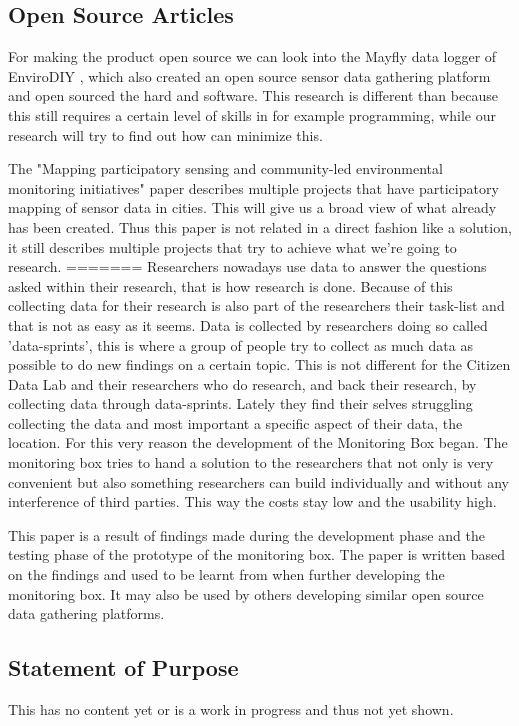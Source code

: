 \documentclass[conference]{IEEEtran}
\begin{document}
\subsection{Open Source Articles}
For making the product open source we can look into the Mayfly data logger of EnviroDIY \cite{arscott2017publishing},  which also created an open source sensor data gathering platform and open sourced the hard and software. This research is different than because this still requires a certain level of skills in for example programming, while our research will try to find out how can minimize this.
\par
The "Mapping participatory sensing and community-led environmental monitoring initiatives" \cite{balestrinideliverable} paper describes multiple projects that have participatory mapping of sensor data in cities. This will give us a broad view of what already has been created. Thus this paper is not related in a direct fashion like a solution, it still describes multiple projects that try to achieve what we're going to research.
=======
 Researchers nowadays use data to answer the questions asked within their research, that is how research is done. Because of this collecting data for their research is also part of the researchers their task-list and that is not as easy as it seems. Data is collected by researchers doing so called 'data-sprints', this is where a group of people try to collect as much data as possible to do new findings on a certain topic. This is not different for the Citizen Data Lab and their researchers who do research, and back their research, by collecting data through data-sprints. Lately they find their selves struggling collecting the data and most important a specific aspect of their data, the location. For this very reason the development of the Monitoring Box began. The monitoring box tries to hand a solution to the researchers that not only is very convenient but also something researchers can build individually and without any interference of third parties. This way the costs stay low and the usability high. \par
This paper is a result of findings made during the development phase and the testing phase of the prototype of the monitoring box. The paper is written based on the findings and used to be learnt from when further developing the monitoring box. It may also be used by others developing similar open source data gathering platforms.

\subsection{Statement of Purpose}
This has no content yet or is a work in progress and thus not yet shown. 
\end{document}
